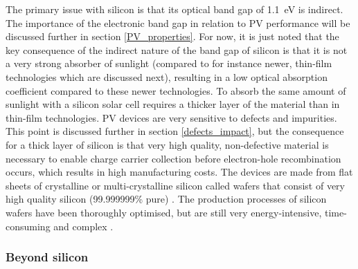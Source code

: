 \documentclass[11pt, twoside]{report}
\begin{document}
The primary issue with silicon is that its optical band gap of \SI{1.1}{eV} is indirect. The importance of the electronic band gap in relation to PV performance will be discussed further in section \ref{PV_properties}. For now, it is just noted that the key consequence of the indirect nature of the band gap of silicon is that it is not a very strong absorber of sunlight (compared to for instance newer, thin-film technologies which are discussed next), resulting in a low optical absorption coefficient  compared to these newer technologies. To absorb the same amount of sunlight with a silicon solar cell requires a thicker layer of the material than in thin-film technologies. PV devices are very sensitive to defects and impurities. This point is discussed further in section \ref{defects_impact}, but the consequence for a thick layer of silicon is that very high quality, non-defective material is necessary to enable charge carrier collection before electron-hole recombination occurs, which results in high manufacturing costs. The devices are made from flat sheets of crystalline or multi-crystalline silicon called wafers that consist of very high quality silicon (99.999999\% pure) 
\cite{sus_book_5}.
The production processes of silicon wafers have been thoroughly optimised, but are still very energy-intensive, time-consuming and complex \cite{emerging_pv}.

\subsubsection{Beyond silicon}
\end{document}
